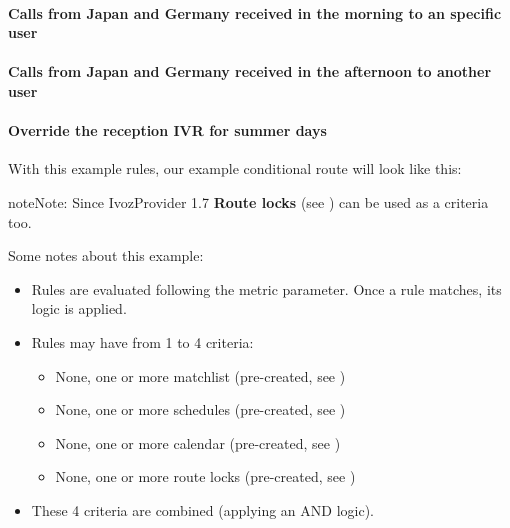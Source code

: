 \documentclass[letterpaper,10pt,english]{sphinxmanual}
\begin{document}
\paragraph{Calls from Japan and Germany received in the morning to an specific user}

\noindent{}
\paragraph{Calls from Japan and Germany received in the afternoon to another user}

\noindent{}
\paragraph{Override the reception IVR for summer days}

\noindent{}

With this example rules, our example conditional route will look like this:

\noindent{}

\begin{notice}{note}{Note:}
Since IvozProvider 1.7 \textbf{Route locks} (see {\hyperref[pbx_features/route_locks:route\string-locks]{}}) can be used as a criteria too.
\end{notice}

Some notes about this example:
\begin{itemize}
\item {} 
Rules are evaluated following the metric parameter. Once a rule matches, its
logic is applied.

\item {} 
Rules may have from 1 to 4 criteria:
\begin{itemize}
\item {} 
None, one or more matchlist (pre-created, see {\hyperref[pbx_features/match_lists:match\string-lists]{}})

\item {} 
None, one or more schedules (pre-created, see {\hyperref[pbx_features/external_filters:schedules]{}})

\item {} 
None, one or more calendar (pre-created, see {\hyperref[pbx_features/external_filters:calendars]{}})

\item {} 
None, one or more route locks (pre-created, see {\hyperref[pbx_features/route_locks:route\string-locks]{}})

\end{itemize}

\item {} 
These 4 criteria are combined (applying an AND logic).

\end{itemize}
\end{document}
